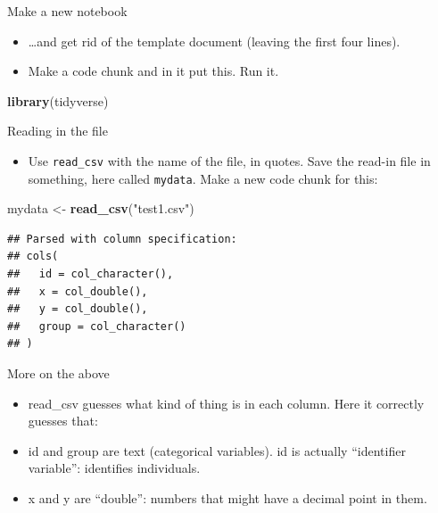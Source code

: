 \documentclass[
  ignorenonframetext,
]{beamer}
\newenvironment{Shaded}{\begin{snugshade}}{\end{snugshade}}
\newcommand{\KeywordTok}[1]{\textcolor[rgb]{0.13,0.29,0.53}{\textbf{#1}}}
\newcommand{\NormalTok}[1]{#1}
\newcommand{\StringTok}[1]{\textcolor[rgb]{0.31,0.60,0.02}{#1}}
\providecommand{\tightlist}{%
  \setlength{\itemsep}{0pt}\setlength{\parskip}{0pt}}
\begin{document}
\begin{frame}[fragile]{Make a new notebook}
\protect\hypertarget{make-a-new-notebook}{}

\begin{itemize}
\tightlist
\item
  \ldots and get rid of the template document (leaving the first four
  lines).
\item
  Make a code chunk and in it put this. Run it.
\end{itemize}

\begin{Shaded}
\begin{Highlighting}[]
\KeywordTok{library}\NormalTok{(tidyverse)}
\end{Highlighting}
\end{Shaded}

\end{frame}

\begin{frame}[fragile]{Reading in the file}
\protect\hypertarget{reading-in-the-file}{}

\begin{itemize}
\tightlist
\item
  Use \texttt{read\_csv} with the name of the file, in quotes. Save the
  read-in file in something, here called \texttt{mydata}. Make a new
  code chunk for this:
\end{itemize}

\begin{Shaded}
\begin{Highlighting}[]
\NormalTok{mydata <-}\StringTok{ }\KeywordTok{read_csv}\NormalTok{(}\StringTok{"test1.csv"}\NormalTok{)}
\end{Highlighting}
\end{Shaded}

\begin{verbatim}
## Parsed with column specification:
## cols(
##   id = col_character(),
##   x = col_double(),
##   y = col_double(),
##   group = col_character()
## )
\end{verbatim}

\end{frame}

\begin{frame}{More on the above}
\protect\hypertarget{more-on-the-above}{}

\begin{itemize}
\tightlist
\item
  read\_csv guesses what kind of thing is in each column. Here it
  correctly guesses that:
\item
  id and group are text (categorical variables). id is actually
  ``identifier variable'': identifies individuals.
\item
  x and y are ``double'': numbers that might have a decimal point in
  them.
\end{itemize}

\end{frame}
\end{document}
